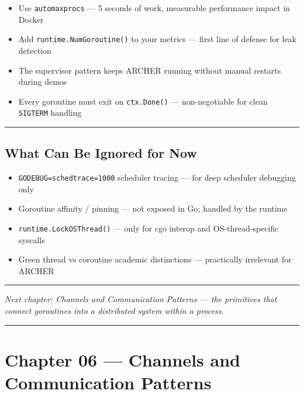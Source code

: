 \documentclass[11pt,a4paper,oneside]{book}
\providecommand{\tightlist}{\setlength{\itemsep}{0pt}\setlength{\parskip}{0pt}}
\begin{document}
\begin{itemize}
\tightlist
\item
  Use \texttt{automaxprocs} --- 5 seconds of work, measurable
  performance impact in Docker
\item
  Add \texttt{runtime.NumGoroutine()} to your metrics --- first line of
  defense for leak detection
\item
  The supervisor pattern keeps ARCHER running without manual restarts
  during demos
\item
  Every goroutine must exit on \texttt{ctx.Done()} --- non-negotiable
  for clean \texttt{SIGTERM} handling
\end{itemize}

\begin{center}\rule{0.5\linewidth}{0.5pt}\end{center}

\subsection{What Can Be Ignored for
Now}

\begin{itemize}
\tightlist
\item
  \texttt{GODEBUG=schedtrace=1000} scheduler tracing --- for deep
  scheduler debugging only
\item
  Goroutine affinity / pinning --- not exposed in Go; handled by the
  runtime
\item
  \texttt{runtime.LockOSThread()} --- only for cgo interop and
  OS-thread-specific syscalls
\item
  Green thread vs coroutine academic distinctions --- practically
  irrelevant for ARCHER
\end{itemize}

\begin{center}\rule{0.5\linewidth}{0.5pt}\end{center}

\emph{Next chapter: Channels and Communication Patterns --- the
primitives that connect goroutines into a distributed system within a
process.}

\begin{center}\rule{0.5\linewidth}{0.5pt}\end{center}

\section{Chapter 06 --- Channels and Communication
Patterns}
\end{document}
